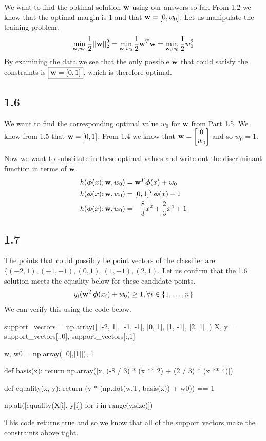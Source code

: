 \documentclass[submit]{harvardml}
\begin{document}
We want to find the optimal solution $\vb{w}$ using our answers so far. From 1.2 we know that the optimal margin is $1$ and that $\vb{w} = [0, w_0]$. Let us manipulate the training problem.
\begin{align*}
    \min_{\vb{w}, w_0} \frac{1}{2} || \vb{w} ||^2_2 = \min_{\vb{w}, w_0} \frac{1}{2} \vb{w}^T \vb{w} = \min_{\vb{w}, w_0} \frac{1}{2} w_0^2
\end{align*}
By examining the data we see that the only possible $\vb{w}$ that could satisfy the constraints is $\boxed{\vb{w} = [0, 1]}$, which is therefore optimal.

\subsection*{1.6}
We want to find the corresponding optimal value $w_0$ for $\vb{w}$ from Part 1.5. We know from 1.5 that $\vb{w} = [0, 1]$. From 1.4 we know that $\vb{w} = \begin{bmatrix}0 \\ w_0\end{bmatrix}$ and so $w_0 = 1$.

Now we want to substitute in these optimal values and write out the discriminant function in terms of $\vb{w}$.
\begin{align*}
    h(\boldsymbol{\phi}(x); \vb{w}, w_0) &= \vb{w}^T \boldsymbol{\phi}(x) + w_0 \\
    h(\boldsymbol{\phi}(x); \vb{w}, w_0) &= [0, 1]^T \boldsymbol{\phi}(x) + 1 \\
    h(\boldsymbol{\phi}(x); \vb{w}, w_0) &= -\frac{8}{3} x^2 + \frac{2}{3} x^4 + 1
\end{align*}

\subsection*{1.7}

The points that could possibly be point vectors of the classifier are $\{ (-2, 1), (-1, -1), (0, 1), (1, -1), (2, 1)$. Let us confirm that the 1.6 solution meets the equality below for these candidate points.
\begin{equation*}
    y_i (\vb{w}^T \boldsymbol{\phi}(x_i) + w_0) \geq 1, \forall i \in \{1, \dots, n\}
\end{equation*}
We can verify this using the code below.
\begin{python}
support_vectors = np.array([
    [-2, 1],
    [-1, -1],
    [0, 1],
    [1, -1],
    [2, 1]
])
X, y = support_vectors[:,0], support_vectors[:,1]

w, w0 = np.array([[0],[1]]), 1

def basis(x):
    return np.array([x, (-8 / 3) * (x ** 2) + (2 / 3) * (x ** 4)])

def equality(x, y):
    return (y * (np.dot(w.T, basis(x)) + w0)) == 1

np.all([equality(X[i], y[i]) for i in range(y.size)])
\end{python}
This code returns true and so we know that all of the support vectors make the constraints above tight.
\end{document}
